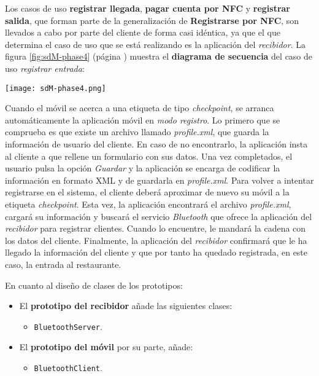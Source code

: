 Los casos de uso \textbf{registrar llegada}, \textbf{pagar cuenta por
\acs{NFC}} y \textbf{registrar salida}, que forman parte de la generalización
de \textbf{Registrarse por \acs{NFC}}, son llevados a cabo por parte del
cliente de forma casi idéntica, ya que el que determina el caso de uso que
se está realizando es la aplicación del \emph{recibidor}. La figura
\ref{fig:sdM-phase4} (página \pageref{fig:sdM-phase4}) muestra el
\textbf{diagrama de secuencia} del caso de uso \emph{registrar entrada}:

  \begin{sidewaysfigure}[h]
    \begin{center}
      \texttt{[image: sdM-phase4.png]}
      \caption{Diagrama de secuencia del caso de uso \emph{registrar entrada},
      de la aplicación móvil.}
      \label{fig:sdM-phase4}
    \end{center}
  \end{sidewaysfigure}

Cuando el móvil se acerca a una etiqueta de tipo \emph{checkpoint}, se
arranca automáticamente la aplicación móvil en \emph{modo registro}. Lo
primero que se comprueba es que existe un archivo llamado \emph{profile.xml},
que guarda la información de usuario del cliente. En caso de no encontrarlo,
la aplicación insta al cliente a que rellene un formulario con sus datos.
Una vez completados, el usuario pulsa la opción \emph{Guardar} y la
aplicación se encarga de codificar la información en formato \acs{XML} y de
guardarla en \emph{profile.xml}. Para volver a intentar registrarse en el
sistema, el cliente deberá aproximar de nuevo su móvil a la etiqueta
\emph{checkpoint}. Esta vez, la aplicación encontrará el archivo
\emph{profile.xml}, cargará su información y buscará el servicio
\emph{Bluetooth} que ofrece la aplicación del \emph{recibidor} para
registrar clientes. Cuando lo encuentre, le mandará la cadena con los datos
del cliente. Finalmente, la aplicación del \emph{recibidor} confirmará que
le ha llegado la información del cliente y que por tanto ha quedado
registrada, en este caso, la entrada al restaurante.

En cuanto al diseño de clases de los prototipos:
\begin{itemize}
\item El \textbf{prototipo del recibidor} añade las siguientes clases:
  \begin{itemize}
  \item \texttt{BluetoothServer}.
  \end{itemize}
\item El \textbf{prototipo del móvil} por su parte, añade:
  \begin{itemize}
  \item \texttt{BluetoothClient}.
  \end{itemize}
\end{itemize}

